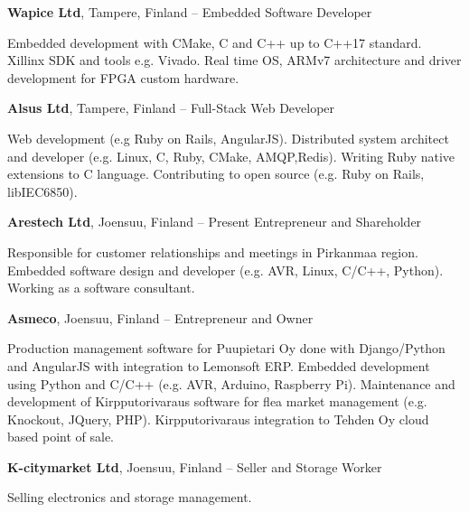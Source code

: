 \documentclass[letterpaper,MMMyyyy,nonstopmode]{simpleresumecv}
\begin{document}
\begin{Body}
\BigGap
\Entry
\textbf{Wapice Ltd}, Tampere, Finland
\hfill
{} -- 
\Gap
\BulletItem Embedded Software Developer
\begin{Detail}
    \SubBulletItem Embedded development with CMake, C and C++ up to C++17 standard.
    \SubBulletItem Xillinx SDK and tools e.g. Vivado.
    \SubBulletItem Real time OS, ARMv7 architecture and driver development for FPGA custom hardware.
\end{Detail}

\BigGap
\Entry
\textbf{Alsus Ltd}, Tampere, Finland
\hfill
{} -- 
\Gap
\BulletItem Full-Stack Web Developer
\begin{Detail}
    \SubBulletItem Web development (e.g Ruby on Rails, AngularJS).
    \SubBulletItem Distributed system architect and developer (e.g. Linux, C, Ruby,
    CMake, AMQP,\newline  Redis).
    \SubBulletItem Writing Ruby native extensions to C language.
    \SubBulletItem Contributing to open source (e.g. Ruby on Rails, libIEC6850).
\end{Detail}

\BigGap
\Entry
\textbf{Arestech Ltd}, Joensuu, Finland
\hfill
{} -- Present
\Gap
\BulletItem Entrepreneur and Shareholder
\begin{Detail}
    \SubBulletItem Responsible for customer relationships and meetings in
    Pirkanmaa region.
    \SubBulletItem Embedded software design and developer (e.g. AVR, Linux,
    C/C++, Python).
    \SubBulletItem Working as a software consultant.
\end{Detail}

\BigGap
\Entry
\textbf{Asmeco}, Joensuu, Finland
\hfill
{} -- 
\Gap
\BulletItem Entrepreneur and Owner
\begin{Detail}
    \SubBulletItem Production management software for Puupietari Oy done with
    Django/Python and \newline AngularJS with integration to Lemonsoft ERP.
    \SubBulletItem Embedded development using Python and C/C++ (e.g. AVR,
    Arduino, Raspberry Pi).
    \SubBulletItem Maintenance and development of Kirpputorivaraus software for
    flea market \newline management (e.g. Knockout, JQuery, PHP).
    \SubBulletItem Kirpputorivaraus integration to Tehden Oy cloud based point
    of sale.
\end{Detail}

\BigGap
\Entry
\textbf{K-citymarket Ltd}, Joensuu, Finland
\hfill
{} -- 
\Gap
\BulletItem Seller and Storage Worker
\begin{Detail}
    \SubBulletItem Selling electronics and storage management.
\end{Detail}


\end{Body}
\end{document}
